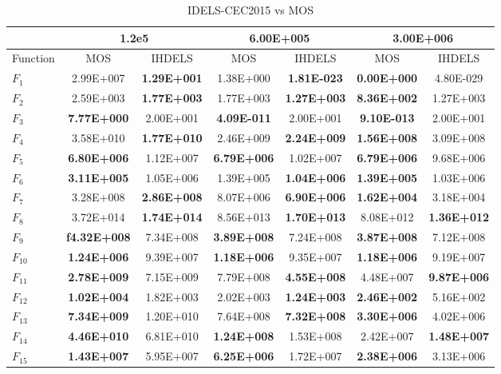 \begin{table}[htp]
  \centering
\caption{IDELS-CEC2015 vs MOS}
{\tiny
\begin{tabular}{l|c|c|c|c|c|c|}
\hline
&  \multicolumn{2}{|c|}{1.2e5} & \multicolumn{2}{|c|}{6.00E+005} & \multicolumn{2}{|c|}{3.00E+006}\\
\hline
Function & MOS                 & IHDELS             & MOS       & IHDELS    & MOS       & IHDELS\\
\hline 
$F_{1}$  & 2.99E+007           & \textbf{1.29E+001} & 1.38E+000 & \textbf{1.81E-023} & \textbf{0.00E+000} & 4.80E-029\\
$F_{2}$  & 2.59E+003           & \textbf{1.77E+003} & 1.77E+003 & \textbf{1.27E+003} & \textbf{8.36E+002} & 1.27E+003\\
$F_{3}$  & \textbf{7.77E+000}  & 2.00E+001          & \textbf{4.09E-011} & 2.00E+001 & \textbf{9.10E-013} & 2.00E+001\\
$F_{4}$  & 3.58E+010           & \textbf{1.77E+010} & 2.46E+009 & \textbf{2.24E+009} & \textbf{1.56E+008} & 3.09E+008\\
$F_{5}$  & \textbf{6.80E+006}  & 1.12E+007          & \textbf{6.79E+006} & 1.02E+007 & \textbf{6.79E+006} & 9.68E+006\\
$F_{6}$  & \textbf{3.11E+005}  & 1.05E+006          & 1.39E+005 & \textbf{1.04E+006} & \textbf{1.39E+005} & 1.03E+006\\
$F_{7}$  & 3.28E+008           & \textbf{2.86E+008} & 8.07E+006 & \textbf{6.90E+006} & \textbf{1.62E+004} & 3.18E+004\\
$F_{8}$  & 3.72E+014           & \textbf{1.74E+014} & 8.56E+013 & \textbf{1.70E+013} & 8.08E+012 & \textbf{1.36E+012}\\
$F_{9}$  & \textbf{f4.32E+008} & 7.34E+008          & \textbf{3.89E+008} & 7.24E+008 & \textbf{3.87E+008} & 7.12E+008\\
$F_{10}$ & \textbf{1.24E+006}  & 9.39E+007          & \textbf{1.18E+006} & 9.35E+007 & \textbf{1.18E+006} & 9.19E+007\\
$F_{11}$ & \textbf{2.78E+009}  & 7.15E+009          & 7.79E+008 & \textbf{4.55E+008} & 4.48E+007 & \textbf{9.87E+006}\\
$F_{12}$ & \textbf{1.02E+004}  & 1.82E+003          & 2.02E+003 & \textbf{1.24E+003} & \textbf{2.46E+002} & 5.16E+002\\
$F_{13}$ & \textbf{7.34E+009}  & 1.20E+010          & 7.64E+008 & \textbf{7.32E+008} & \textbf{3.30E+006} & 4.02E+006\\
$F_{14}$ & \textbf{4.46E+010}  & 6.81E+010          & \textbf{1.24E+008} & 1.53E+008 & 2.42E+007 & \textbf{1.48E+007}\\
$F_{15}$ & \textbf{1.43E+007}  & 5.95E+007          & \textbf{6.25E+006} & 1.72E+007 & \textbf{2.38E+006} & 3.13E+006\\
\hline
\end{tabular}
}
\end{table}
